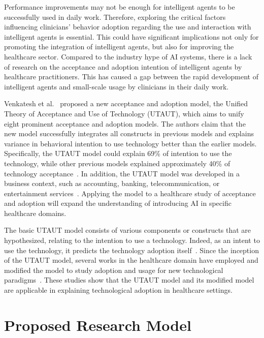 Performance improvements may not be enough for intelligent agents to be successfully used in daily work.
Therefore, exploring the critical factors influencing clinicians’ behavior adoption regarding the use and interaction with intelligent agents is essential.
This could have significant implications not only for promoting the integration of intelligent agents, but also for improving the healthcare sector.
Compared to the industry hype of AI systems, there is a lack of research on the acceptance and adoption intention of intelligent agents by healthcare practitioners.
This has caused a gap between the rapid development of intelligent agents and small-scale usage by clinicians in their daily work.

Venkatesh et al.~\cite{venkatesh2016unified} proposed a new acceptance and adoption model, the Unified Theory of Acceptance and Use of Technology (UTAUT), which aims to unify eight prominent acceptance and adoption models.
The authors claim that the new model successfully integrates all constructs in previous models and explains variance in behavioral intention to use technology better than the earlier models.
Specifically, the UTAUT model could explain 69\% of intention to use the technology, while other previous models explained approximately 40\% of technology acceptance~\cite{10.2307/30036540}.
In addition, the UTAUT model was developed in a business context, such as accounting, banking, telecommunication, or entertainment services~\cite{KIJSANAYOTIN2009404}.
Applying the model to a healthcare study of acceptance and adoption will expand the understanding of introducing AI in specific healthcare domains.

The basic UTAUT model consists of various components or constructs that are hypothesized, relating to the intention to use a technology.
Indeed, as an intent to use the technology, it predicts the technology adoption itself~\cite{DEANGELI2020102412, HART201993, Zhang2022}.
Since the inception of the UTAUT model, several works in the healthcare domain have employed and modified the model to study adoption and usage for new technological paradigms~\cite{KALAVANI2018287}.
These studies show that the UTAUT model and its modified model are applicable in explaining technological adoption in healthcare settings.

\section{Proposed Research Model}
\label{chap:app003002}

